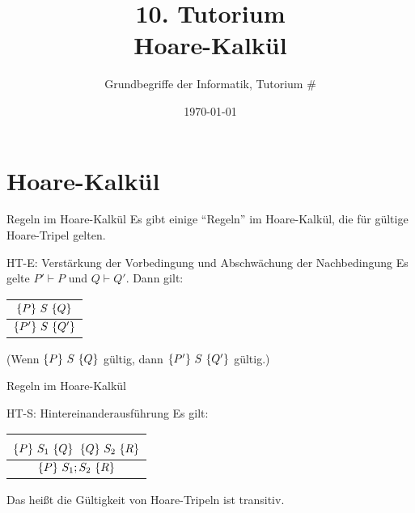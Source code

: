 




\usepackage{tcolorbox}

\newcommand{\HTB}[1]{\ensuremath{\colorbox{lightgray!90}{\{ #1 \}}}}
\newcommand{\HT}[3]{\ensuremath{\HTB{#1} \; #2 \; \HTB{#3}}}


\title[Hoare-Kalkül]{10. Tutorium\\ Hoare-Kalkül}
\subtitle{Grundbegriffe der Informatik, Tutorium \#\mytutnumber}
\date{\today}


\titleframe
\roadmap

\section{Hoare-Kalkül}
\begin{frame}{Regeln im Hoare-Kalkül}
	Es gibt einige ``Regeln'' im Hoare-Kalkül, die für gültige Hoare-Tripel gelten.

	\begin{block}{HT-E: Verstärkung der Vorbedingung und Abschwächung der Nachbedingung}
		Es gelte $P' \vdash P$ und $Q\vdash Q'$. Dann gilt:
		 \begin{center}\begin{tabular}{c}
						$\left\{ P \right\} \, S \, \left\{ Q \right\}$\\
						\midrule
						$\left\{ P' \right\} \, S \, \left\{ Q' \right\}$
		\end{tabular}\end{center}
		(Wenn $\left\{ P \right\} \, S \, \left\{ Q \right\}$ gültig, dann $\left\{ P' \right\} \, S \, \left\{ Q' \right\}$ gültig.)
	\end{block}

\end{frame}

\begin{frame}{Regeln im Hoare-Kalkül}

	\begin{block}{HT-S: Hintereinanderausführung}
		Es gilt: \begin{center}\begin{tabular}{c}
			$\left\{ P \right\} \, S_1 \, \left\{ Q \right\}$ \qquad $\left\{ Q \right\} \, S_2 \, \left\{ R \right\}$\\
			\midrule
			$\left\{ P \right\} \, S_1 ; S_2 \, \left\{ R \right\}$
		\end{tabular}\end{center}
		Das heißt die Gültigkeit von Hoare-Tripeln ist transitiv. 
		
	\end{block}
\end{frame}

